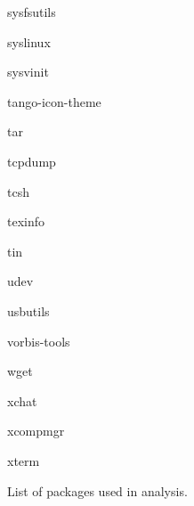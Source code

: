 \documentclass[letterpaper,10pt]{article}
\begin{document}
\begin{figure}[h]
\begin{multicols}{3}
\begin{itemize*}
    \item sysfsutils
    \item syslinux
    \item sysvinit
    \item tango-icon-theme
    \item tar
    \item tcpdump
    \item tcsh
    \item texinfo
    \item tin
    \item udev
    \item usbutils
    \item vorbis-tools
    \item wget
    \item xchat
    \item xcompmgr
    \item xterm
    \end{itemize*}
  \end{multicols}
  \caption{List of packages used in analysis.}
  \label{fig:pkg_list}
\end{figure}
\end{document}
